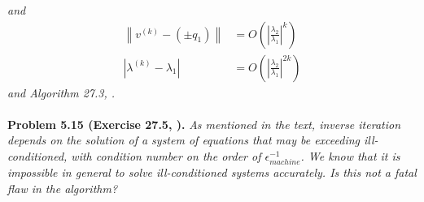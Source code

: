 \documentclass[a4paper,oneside]{book}
\numberwithin{equation}{chapter}
\begin{document}
\textit{and}
\begin{align}
\left\| {{v^{\left( k \right)}} - \left( { \pm {q_1}} \right)} \right\| &= O\left( {{{\left| {\frac{{{\lambda _2}}}{{{\lambda _1}}}} \right|}^k}} \right)\\
\left| {{\lambda ^{\left( k \right)}} - {\lambda _1}} \right| &= O\left( {{{\left| {\frac{{{\lambda _2}}}{{{\lambda _1}}}} \right|}^{2k}}} \right)
\end{align}
\textit{and Algorithm 27.3, \cite{1}.}\\
\\
\textbf{Problem 5.15 (Exercise 27.5, \cite{1}).} \textit{As mentioned in the text, inverse iteration depends on the solution of a system of equations that may be exceeding ill-conditioned, with condition number on the order of $\epsilon _{machine}^{ - 1}$. We know that it is impossible in general to solve ill-conditioned systems accurately. Is this not a fatal flaw in the algorithm?}
\end{document}
